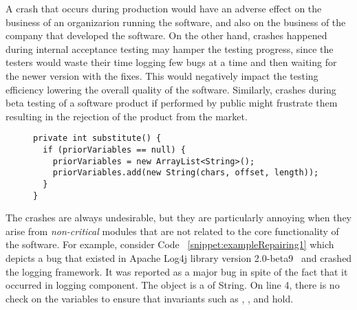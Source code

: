 A crash that occurs during production would
have an adverse effect on the business of an organizarion running the software, and also on the business
of the company that developed the software. On the other hand,
crashes happened during internal acceptance testing may hamper the 
testing progress, since the testers would waste their time logging few bugs at a time and then waiting for the newer version with the fixes.
This would negatively impact the testing efficiency lowering the overall quality of the software.
Similarly, crashes during beta testing of a software product if performed by public might frustrate them 
resulting in the rejection of the product from the market.




\lstset{language=Java , caption=Apache Log4j bug example.,
label=snippet:exampleRepairing1}
\begin{figure}[t]
\begin{lstlisting}
private int substitute() {
  if (priorVariables == null) {
    priorVariables = new ArrayList<String>();
    priorVariables.add(new String(chars, offset, length));
  }
}
\end{lstlisting}
\end{figure}

The crashes are always undesirable, but they are particularly annoying when they arise from \textit{non-critical} modules
that are not related to the core functionality of the software. For example, consider Code ~\ref{snippet:exampleRepairing1} which depicts a
bug that
existed in Apache Log4j library version 2.0-beta9~\cite{ApacheLog4jBug} and crashed
the logging framework. It was reported as a major bug in
spite of the fact that it occurred in logging component. The object
 is a  of String. On line 4, there is no check on the variables to ensure
that invariants such as , , and  hold.


